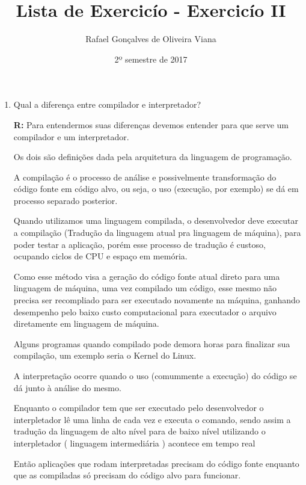 \documentclass[12pt]{article}
\title{Lista de Exercicío  - Exercicío II }
\author{Rafael Gonçalves de  Oliveira Viana}
\date{2º semestre de 2017}
\begin{document}
\maketitle

\begin{enumerate}
\item
Qual a diferença entre compilador e interpretador?

\textbf{R:}	
Para entendermos suas diferenças devemos entender para que serve um compilador e um interpretador.
 
Os dois são definições dada pela arquitetura da linguagem de programação.

A compilação é o processo de análise e possivelmente transformação do código fonte em código alvo, ou seja, o uso (execução, por exemplo) se dá em processo separado posterior.

Quando utilizamos uma linguagem compilada, o desenvolvedor deve executar a compilação (Tradução da linguagem atual pra linguagem de máquina), para poder testar a aplicação, porém esse processo de tradução é custoso, ocupando ciclos de CPU e espaço em memória.

Como esse método visa a geração do código fonte atual direto para uma linguagem de máquina, uma vez compilado um código, esse mesmo não precisa ser recompliado para ser executado novamente na máquina, ganhando desempenho pelo baixo custo computacional para executador o arquivo diretamente em linguagem de máquina.

Alguns programas quando compilado pode demora horas para finalizar sua compilação, um exemplo seria o Kernel do Linux. 

A interpretação ocorre quando o uso (comummente a execução) do código se dá junto à análise do mesmo.

Enquanto o compilador tem que ser executado pelo desenvolvedor o interpletador lê uma linha de cada vez e executa o comando, sendo assim a tradução da linguagem de alto nível para de baixo nível utilizando o interpletador ( linguagem intermediária ) acontece em tempo real

Então aplicações que rodam interpretadas precisam do código fonte enquanto que as compiladas só precisam do código alvo para funcionar.









 
 
\end{enumerate}
\end{document}
